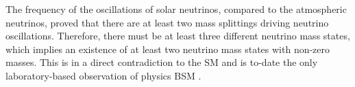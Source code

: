 The frequency of the oscillations of solar neutrinos, compared to the atmospheric neutrinos, proved that there are at least two mass splittings driving neutrino oscillations. Therefore, there must be at least three different neutrino mass states, which implies an existence of at least two neutrino mass states with non-zero masses. This is in a direct contradiction to the \gls{SM} and is to-date the only laboratory-based observation of physics \gls{BSM} \cite{SnowmassNeutrinoFrontierReport.pdf}.



